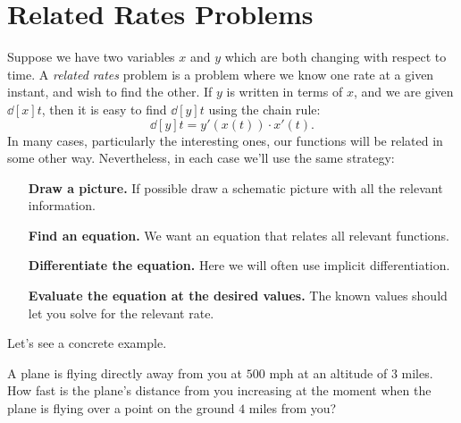 \section{Related Rates Problems}

Suppose we have two variables $x$ and $y$ which are both changing with
respect to time.  A \textit{related rates} problem is a problem where
we know one rate at a given instant, and wish to find the other.  If
$y$ is written in terms of $x$, and we are given $\dd[x]{t}$, then it
is easy to find $\dd[y]{t}$ using the chain rule:
\[
\dd[y]{t}=y'(x(t))\cdot x'(t).
\]
In many cases, particularly the interesting ones, our functions will
be related in some other way. Nevertheless, in each case we'll use the
same strategy:

\begin{guidelinesForRelatedRates}\hfil
\begin{itemize}
\item[\textbf{Draw a picture.}] If possible draw a schematic picture with all the relevant information. 
\item[\textbf{Find an equation.}] We want an equation that relates all relevant functions. 
\item[\textbf{Differentiate the equation.}] Here we will often use
  implicit differentiation.
\item[\textbf{Evaluate the equation at the desired values.} ] The known values
  should let you solve for the relevant rate.
\end{itemize}
\end{guidelinesForRelatedRates}
Let's see a concrete example. 

\begin{example}
\label{exam:receding airplane}
A plane is flying directly away from you at $500$ mph at an altitude of
$3$ miles.  How fast is the plane's distance from you increasing at the
moment when the plane is flying over a point on the ground $4$ miles
from you?
\end{example}

